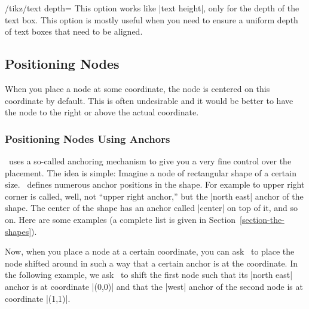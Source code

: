 \begin{key}{/tikz/text depth=}
  This option works like |text height|, only for the depth of the text
  box. This option is mostly useful when you need to ensure a uniform
  depth of text boxes that need to be aligned.
\end{key}



\subsection{Positioning Nodes}

\label{section-nodes-anchors}

When you place a node at some coordinate, the node is centered on this
coordinate by default. This is often undesirable and it would be
better to have the node to the right or above the actual coordinate.


\subsubsection{Positioning Nodes Using Anchors}

\pgfname\ uses a so-called anchoring mechanism to give you a very fine
control over the placement. The idea is simple: Imagine a node of
rectangular shape of a certain size. \pgfname\ defines numerous anchor
positions in the shape. For example to upper right corner is called,
well, not ``upper right anchor,'' but the |north east| anchor of the
shape. The center of the shape has an anchor called |center| on top of
it, and so on. Here are some examples (a complete list is given in
Section~\ref{section-the-shapes}).

\medskip\noindent
{}

Now, when you place a node at a certain coordinate, you can ask \tikzname\
to place the node shifted around in such a way that a certain
anchor is at the coordinate. In the following example, we ask \tikzname\
to shift the first node such that its  |north east| anchor is at
coordinate |(0,0)| and that the |west| anchor of the second node is at
coordinate |(1,1)|.

